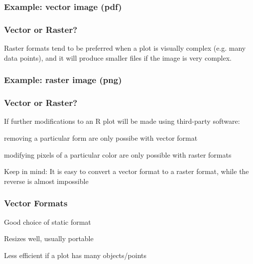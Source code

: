\documentclass[12pt]{beamer}\usepackage[]{graphicx}\usepackage[]{color}
\begin{document}

\begin{frame}
\frametitle{Example: vector image (pdf)}
\begin{center}
\end{center}
\end{frame}


\begin{frame}
\frametitle{Vector or Raster?}

Raster formats tend to be preferred when a plot is visually complex (e.g. many data points), and it will produce smaller files if the image is very complex.
\eb

\end{frame}


\begin{frame}
\frametitle{Example: raster image (png)}
\begin{center}
\end{center}
\end{frame}


\begin{frame}
\frametitle{Vector or Raster?}

If further modifications to an R plot will be made using third-party software:
\bi
  \item removing a particular form are only possibe with vector format
  \item modifying pixels of a particular color are only possible with raster formats
\ei

{\lit Keep in mind: It is easy to convert a vector format to a raster format, while the reverse is almost impossible}

\end{frame}


\begin{frame}
\frametitle{Vector Formats}

\bi
  \item Good choice of static format
  \item Resizes well, usually portable
  \item Less efficient if a plot has many objects/points
\ei
\eb

\end{frame}
\end{document}
